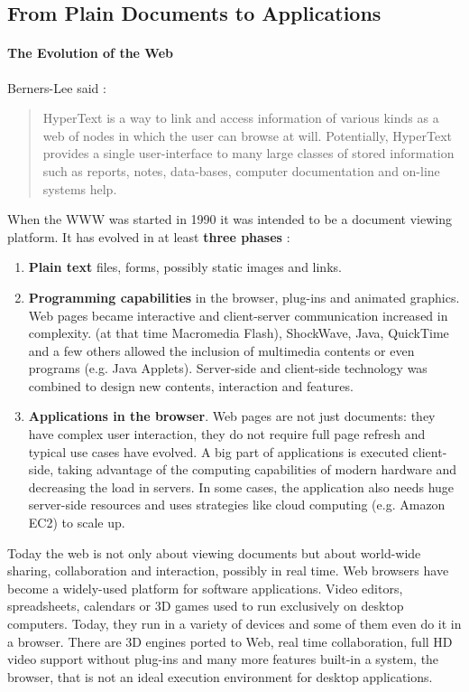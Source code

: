 \subsection{From Plain Documents to Applications}
\paragraph{The Evolution of the Web}
Berners-Lee said \cite{BernersLee:1990}:
\begin{quote} 
HyperText is a way to link and access information of various kinds as a web of nodes in which the user can browse at will. 
Potentially, HyperText provides a single user-interface to many large classes of stored information such as reports, notes, data-bases, computer documentation and on-line systems help.
\end{quote} 

When the \ac{WWW} was started in 1990 it was intended to be a document viewing platform.
It has evolved in at least \textbf{three phases} \cite{Anttonen:2011} \cite{Taivalsaari:2008}:

\begin{enumerate}
\item \textbf{Plain text} files, forms, possibly static images and links.
\item \textbf{Programming capabilities} in the browser, plug-ins and animated graphics. 
Web pages became interactive and client-server communication increased in complexity.
\flash (at that time Macromedia Flash), ShockWave, Java, QuickTime and a few others allowed the inclusion of multimedia contents or even programs (e.g. Java Applets).
Server-side and client-side technology was combined to design new contents, interaction and features.
\item \textbf{Applications in the browser}.
Web pages are not just documents: they have complex user interaction, they do not require full page refresh and typical use cases have evolved. 
A big part of applications is executed client-side, taking advantage of the computing capabilities of modern hardware and decreasing the load in servers. 
In some cases, the application also needs huge server-side resources and uses strategies like cloud computing (e.g. Amazon EC2) to scale up.
\end{enumerate}

Today the web is not only about viewing documents but about world-wide sharing, collaboration and interaction, possibly in real time. 
Web browsers have become a widely-used platform for software applications. 
Video editors, spreadsheets, calendars or 3D games used to run exclusively on desktop computers. 
Today, they run in a variety of devices and some of them even do it in a browser. 
There are 3D engines ported to Web, real time collaboration, full HD video support without plug-ins and many more features built-in a system, the browser, that is not an ideal execution environment for desktop applications.

